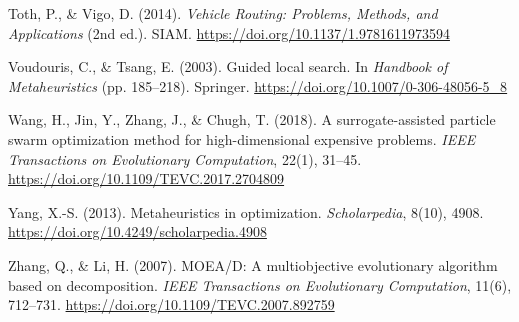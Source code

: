 \documentclass[10pt,a4paper]{article}
\begin{document}
\begin{thebibliography}{99}
Toth, P., \& Vigo, D. (2014). \textit{Vehicle Routing: Problems, Methods, and Applications} (2nd ed.). SIAM. \url{https://doi.org/10.1137/1.9781611973594}

Voudouris, C., \& Tsang, E. (2003). Guided local search. In \textit{Handbook of Metaheuristics} (pp. 185–218). Springer. \url{https://doi.org/10.1007/0-306-48056-5_8}

Wang, H., Jin, Y., Zhang, J., \& Chugh, T. (2018). A surrogate-assisted particle swarm optimization method for high-dimensional expensive problems. \textit{IEEE Transactions on Evolutionary Computation}, 22(1), 31–45. \url{https://doi.org/10.1109/TEVC.2017.2704809}

Yang, X.-S. (2013). Metaheuristics in optimization. \textit{Scholarpedia}, 8(10), 4908. \url{https://doi.org/10.4249/scholarpedia.4908}

Zhang, Q., \& Li, H. (2007). MOEA/D: A multiobjective evolutionary algorithm based on decomposition. \textit{IEEE Transactions on Evolutionary Computation}, 11(6), 712–731. \url{https://doi.org/10.1109/TEVC.2007.892759}

\end{thebibliography}
\end{document}
